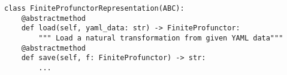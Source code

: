 \begin{verbatim}
class FiniteProfunctorRepresentation(ABC):
    @abstractmethod
    def load(self, yaml_data: str) -> FiniteProfunctor:
        """ Load a natural transformation from given YAML data"""
    @abstractmethod
    def save(self, f: FiniteProfunctor) -> str:
        ...
\end{verbatim}